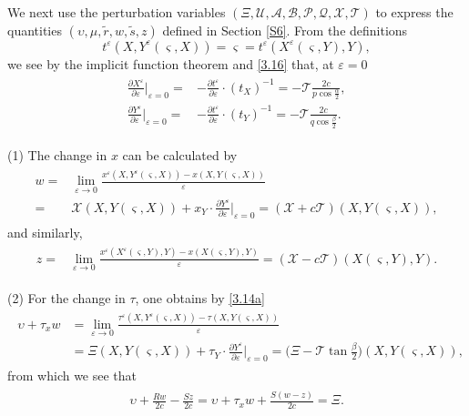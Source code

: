 \documentclass[11pt,reqno]{article}
\newcommand{\eps}{\varepsilon}
\newcommand{\fr}{\frac}
\newcommand{\pa}{\partial}
\numberwithin{equation}{section}
\begin{document}
We next use the perturbation variables $(\Xi, \mathcal{U}, \mathcal{A}, \mathcal{B}, \mathcal{P}, \mathcal{Q}, \mathcal{X}, \mathcal{T})$ to express the quantities $(\upsilon, \mu, \tilde{r}, w, \tilde{s}, z)$ defined in Section \ref{S6}. From the definitions
$$
t^\eps(X, Y^\eps(\varsigma, X))=\varsigma=t^\eps(X^\eps(\varsigma, Y), Y),
$$
we see by the implicit function theorem and \eqref{3.16} that, at $\eps=0$
\begin{align*}
\begin{split}
\fr{\pa X^\eps}{\pa \eps}\Big|_{\eps=0}=&-\fr{\pa t^\eps}{\pa \eps}\cdot (t_X)^{-1}=-\mathcal{T}\fr{2c}{p\cos\fr{\alpha}{2}},\\
\fr{\pa Y^\eps}{\pa \eps}\Big|_{\eps=0}=&-\fr{\pa t^\eps}{\pa \eps}\cdot (t_Y)^{-1}=-\mathcal{T}\fr{2c}{q\cos\fr{\beta}{2}}.
\end{split}
\end{align*}

(1) The change in $x$ can be calculated by
\begin{align}\label{7.5}
\begin{split}
w=&\lim_{\eps\rightarrow0}\fr{x^\eps(X,Y^\eps(\varsigma, X))-x(X,Y(\varsigma, X))}{\eps} \\
=&\mathcal{X}(X, Y(\varsigma, X))+x_Y\cdot\fr{\pa Y^\eps}{\pa \eps}\Big|_{\eps=0} =(\mathcal{X}+c\mathcal{T})(X, Y(\varsigma, X)),
\end{split}
\end{align}
and similarly,
\begin{align}\label{7.6}
\begin{split}
z=&\lim_{\eps\rightarrow0}\fr{x^\eps(X^\eps(\varsigma, Y),Y)-x(X(\varsigma, Y),Y)}{\eps} =(\mathcal{X}-c\mathcal{T})(X(\varsigma, Y), Y).
\end{split}
\end{align}

(2) For the change in $\tau$, one obtains by \eqref{3.14a}
\begin{align*}
\begin{split}
\upsilon +\tau_xw&=\lim_{\eps\rightarrow0} \fr{\tau^\eps(X,Y^\eps(\varsigma, X))-\tau(X,Y(\varsigma, X))}{\eps} \\
&=\Xi(X,Y(\varsigma, X))+\tau_Y\cdot \fr{\pa Y^\eps}{\pa \eps}\Big|_{\eps=0} =\Big(\Xi-\mathcal{T}\tan\fr{\beta}{2}\Big)(X,Y(\varsigma, X)),
\end{split}
\end{align*}
from which we see that
\begin{align}\label{7.7}
\begin{split}
\upsilon +\fr{Rw}{2c}-\fr{Sz}{2c}=\upsilon +\tau_x w+\fr{S(w-z)}{2c} =\Xi.
\end{split}
\end{align}
\end{document}
